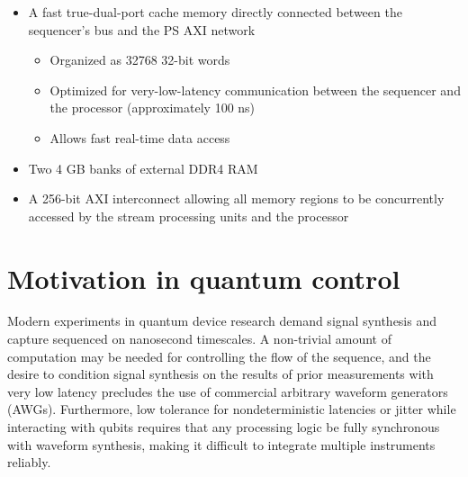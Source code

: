 \begin{itemize}
    \begin{itemize}
        \item Two full-bandwidth capture paths write a stream directly to memory

        \item Four complex multiplier/accumulator units 
        \begin{itemize}
            \item Real-time signal filtering and decimation using an arbitrary filter kernel
            \item Short pipeline provides results to the sequencer within 50 ns
            \item Able to be automatically reset allowing back-to-back repeated captures
        \end{itemize}

    \end{itemize}

    \item A fast true-dual-port cache memory directly connected between the sequencer's bus and the PS AXI network
    \begin{itemize}
        \item Organized as 32768 32-bit words
        \item Optimized for very-low-latency communication between the sequencer and the processor (approximately 100 ns)
        \item Allows fast real-time data access
    \end{itemize}
  
    \item Two 4 GB banks of external DDR4 RAM
    \item A 256-bit AXI interconnect allowing all memory regions to be concurrently accessed by the stream processing units and the processor
\end{itemize}

\section{Motivation in quantum control} \label{sec_motivation}

Modern experiments in quantum device research demand signal synthesis and capture sequenced on nanosecond timescales. A non-trivial amount of computation may be needed for controlling the flow of the sequence, and the desire to condition signal synthesis on the results of prior measurements with very low latency precludes the use of commercial arbitrary waveform generators (AWGs). Furthermore, low tolerance for nondeterministic latencies or jitter while interacting with qubits requires that any processing logic be fully synchronous with waveform synthesis, making it difficult to integrate multiple instruments reliably. 


